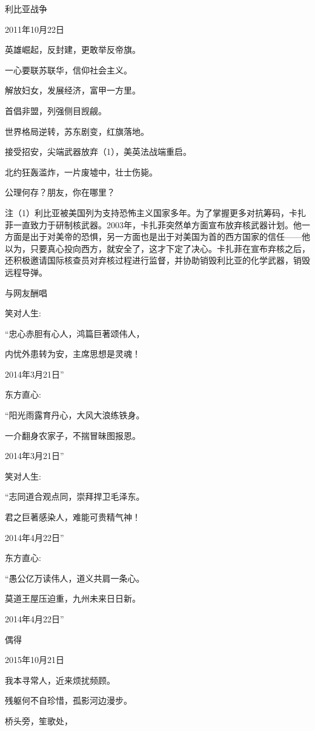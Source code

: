 \documentclass[../../dazhuan.tex]{subfiles}
\begin{document}
利比亚战争

2011年10月22日

英雄崛起，反封建，更敢举反帝旗。

一心要联苏联华，信仰社会主义。

解放妇女，发展经济，富甲一方里。

首倡非盟，列强侧目觊觎。



世界格局逆转，苏东剧变，红旗落地。

接受招安，尖端武器放弃（1），美英法战端重启。

北约狂轰滥炸，一片废墟中，壮士伤毙。

公理何存？朋友，你在哪里？

注（1）利比亚被美国列为支持恐怖主义国家多年。为了掌握更多对抗筹码，卡扎菲一直致力于研制核武器。2003年，卡扎菲突然单方面宣布放弃核武器计划。他一方面是出于对美帝的恐惧，另一方面也是出于对美国为首的西方国家的信任——他以为，只要真心投向西方，就安全了，这才下定了决心。卡扎菲在宣布弃核之后，还积极邀请国际核查员对弃核过程进行监督，并协助销毁利比亚的化学武器，销毁远程导弹。



与网友酬唱

笑对人生:

“忠心赤胆有心人，鸿篇巨著颂伟人，

内忧外患转为安，主席思想是灵魂！

2014年3月21日”

东方直心:

“阳光雨露育丹心，大风大浪练铁身。

一介翻身农家子，不揣冒昧图报恩。

2014年3月21日”

笑对人生:

“志同道合观点同，崇拜捍卫毛泽东。

君之巨著感染人，难能可贵精气神！

2014年4月22日”

东方直心:

“愚公亿万读伟人，道义共肩一条心。

莫道王屋压迫重，九州未来日日新。

2014年4月22日”



偶得

2015年10月21日

我本寻常人，近来烦扰频顾。

残躯何不自珍惜，孤影河边漫步。

桥头旁，笙歌处，
\end{document}
